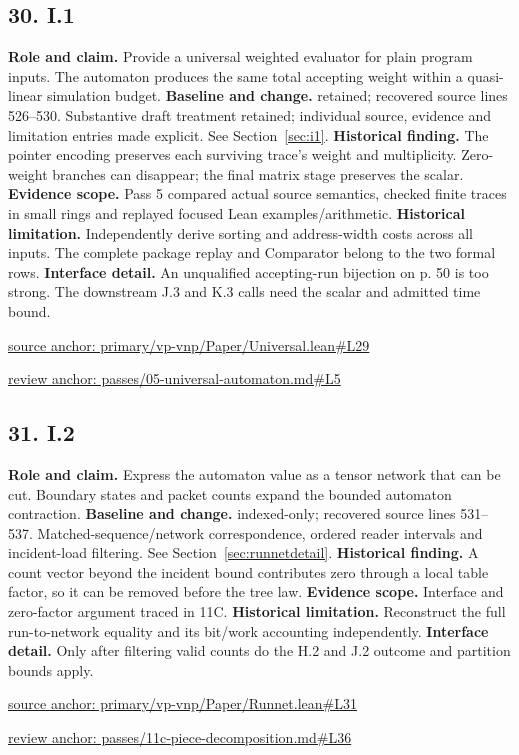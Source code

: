 \documentclass[11pt,letterpaper]{article}
\theoremstyle{definition}\newtheorem{definition}[theorem]{Definition}\newtheorem{example}[theorem]{Example}
\theoremstyle{remark}\newtheorem{remark}[theorem]{Remark}
\begin{document}
\subsection*{30. I.1}
\textbf{Role and claim.} Provide a universal weighted evaluator for plain program inputs. The automaton produces the same total accepting weight within a quasi-linear simulation budget.
\textbf{Baseline and change.} retained; recovered source lines 526--530. Substantive draft treatment retained; individual source, evidence and limitation entries made explicit. See Section~\ref{sec:i1}.
\textbf{Historical finding.} The pointer encoding preserves each surviving trace's weight and multiplicity. Zero-weight branches can disappear; the final matrix stage preserves the scalar.
\textbf{Evidence scope.} Pass 5 compared actual source semantics, checked finite traces in small rings and replayed focused Lean examples/arithmetic.
\textbf{Historical limitation.} Independently derive sorting and address-width costs across all inputs. The complete package replay and Comparator belong to the two formal rows.
\textbf{Interface detail.} An unqualified accepting-run bijection on p. 50 is too strong. The downstream J.3 and K.3 calls need the scalar and admitted time bound.
\par\href{https://github.com/nousentllc/VP-VNP-Review/blob/8a7976933b6b2b4ffda1ad3a0dfb5fc6b6f023e8/primary/vp-vnp/Paper/Universal.lean\#L29}{source anchor: primary/vp-vnp/Paper/Universal.lean\#L29}
\par\href{https://github.com/nousentllc/VP-VNP-Review/blob/8a7976933b6b2b4ffda1ad3a0dfb5fc6b6f023e8/passes/05-universal-automaton.md\#L5}{review anchor: passes/05-universal-automaton.md\#L5}
\goodbreak
\subsection*{31. I.2}
\textbf{Role and claim.} Express the automaton value as a tensor network that can be cut. Boundary states and packet counts expand the bounded automaton contraction.
\textbf{Baseline and change.} indexed-only; recovered source lines 531--537. Matched-sequence/network correspondence, ordered reader intervals and incident-load filtering. See Section~\ref{sec:runnetdetail}.
\textbf{Historical finding.} A count vector beyond the incident bound contributes zero through a local table factor, so it can be removed before the tree law.
\textbf{Evidence scope.} Interface and zero-factor argument traced in 11C.
\textbf{Historical limitation.} Reconstruct the full run-to-network equality and its bit/work accounting independently.
\textbf{Interface detail.} Only after filtering valid counts do the H.2 and J.2 outcome and partition bounds apply.
\par\href{https://github.com/nousentllc/VP-VNP-Review/blob/8a7976933b6b2b4ffda1ad3a0dfb5fc6b6f023e8/primary/vp-vnp/Paper/Runnet.lean\#L31}{source anchor: primary/vp-vnp/Paper/Runnet.lean\#L31}
\par\href{https://github.com/nousentllc/VP-VNP-Review/blob/8a7976933b6b2b4ffda1ad3a0dfb5fc6b6f023e8/passes/11c-piece-decomposition.md\#L36}{review anchor: passes/11c-piece-decomposition.md\#L36}
\goodbreak
\end{document}

